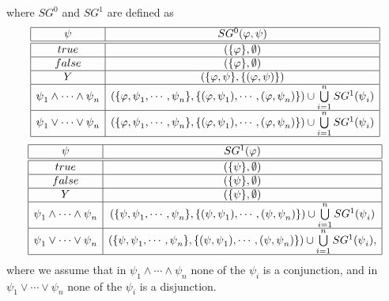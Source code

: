 where $SG^{0}$ and $SG^{1}$ are defined as%
\begin{equation*}
\begin{array}{|c|c|}
\hline
\psi & SG^{0}(\varphi ,\psi ) \\ \hline\hline
true & (\{\varphi \},\emptyset ) \\ \hline
false & (\{\varphi \},\emptyset ) \\ \hline
Y & (\{\varphi ,\psi \},\{(\varphi ,\psi )\}) \\ \hline
\psi _{1}\wedge \cdots \wedge \psi _{n} & \left( \{\varphi ,\psi _{1},\cdots
,\psi _{n}\},\{(\varphi ,\psi _{1}),\cdots ,(\varphi ,\psi _{n})\}\right)
\cup \bigcup\limits_{i=1}^{n}SG^{1}(\psi _{i}) \\ \hline
\psi _{1}\vee \cdots \vee \psi _{n} & \left( \{\varphi ,\psi _{1},\cdots
,\psi _{n}\},\{(\varphi ,\psi _{1}),\cdots ,(\varphi ,\psi _{n})\}\right)
\cup \bigcup\limits_{i=1}^{n}SG^{1}(\psi _{i}) \\ \hline
\end{array}%
\end{equation*}%
\begin{equation*}
\begin{array}{|c|c|}
\hline
\psi & SG^{1}(\varphi ) \\ \hline\hline
true & (\{\psi \},\emptyset ) \\ \hline
false & (\{\psi \},\emptyset ) \\ \hline
Y & (\{\psi \},\emptyset ) \\ \hline
\psi _{1}\wedge \cdots \wedge \psi _{n} & \left( \{\psi ,\psi _{1},\cdots
,\psi _{n}\},\{(\psi ,\psi _{1}),\cdots ,(\psi ,\psi _{n})\}\right) \cup
\bigcup\limits_{i=1}^{n}SG^{1}(\psi _{i}) \\ \hline
\psi _{1}\vee \cdots \vee \psi _{n} & \left( \{\psi ,\psi _{1},\cdots ,\psi
_{n}\},\{(\psi ,\psi _{1}),\cdots ,(\psi ,\psi _{n})\}\right) \cup
\bigcup\limits_{i=1}^{n}SG^{1}(\psi _{i}), \\ \hline
\end{array}%
\end{equation*}%
where we assume that in $\psi _{1}\wedge \cdots \wedge \psi _{n}$ none of
the $\psi _{i}$ is a conjunction, and in $\psi _{1}\vee \cdots \vee \psi
_{n} $ none of the $\psi _{i}$ is a disjunction.\newpage
